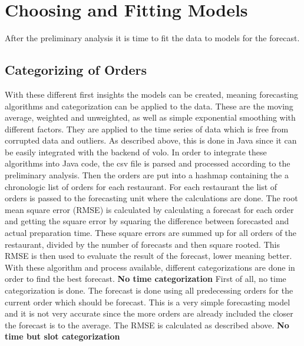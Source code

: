 \section{Choosing and Fitting Models}\label{Choosing and Fitting Models}
After the preliminary analysis it is time to fit the data to models for the forecast.
\subsection{Categorizing of Orders}\label{subsection:Categorizing by Order}
With these different first insights the models can be created, meaning forecasting algorithms and categorization can be applied to the data. These are the moving average, weighted and unweighted, as well as simple exponential smoothing with different factors. They are applied to the time series of data which is free from corrupted data and outliers. As described above, this is done in Java since it can be easily integrated with the backend of volo.\newline
In order to integrate these algorithms into Java code, the csv file is parsed and processed according to the preliminary analysis. Then the orders are put into a hashmap containing the a chronologic list of orders for each restaurant. For each restaurant the list of orders is passed to the forecasting unit where the calculations are done. The root mean square error (RMSE) is calculated by calculating a forecast for each order and getting the square error by squaring the difference between forecasted and actual preparation time. These square errors are summed up for all orders of the restaurant, divided by the number of forecasts and then square rooted. This RMSE is then used to evaluate the result of the forecast, lower meaning better.\newline
With these algorithm and process available, different categorizations are done in order to find the best forecast.
\newline\newline\textbf{No time categorization}\newline
First of all, no time categorization is done. The forecast is done using all predecessing orders for the current order which should be forecast. This is a very simple forecasting model and it is not very accurate since the more orders are already included the closer the forecast is to the average. The RMSE is calculated as described above.
\newline\newline\textbf{No time but slot categorization}\newline
